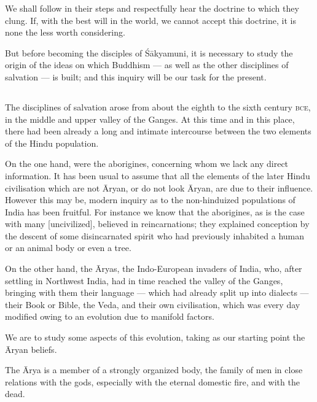 \documentclass[a4paper, 11pt, oneside, english]{article}
\begin{document}
We shall follow in their steps and respectfully hear the doctrine to which they clung. If, with the best will in the world, we cannot accept this doctrine, it is none the less worth considering.

But before becoming the disciples of Śākyamuni, it is necessary to study the origin of the ideas on which Buddhism --- as well as the other disciplines of salvation --- is built; and this inquiry will be our task for the present.

\subsection{}
\paragraph{}
The disciplines of salvation arose from about the eighth to the sixth century \textsc{bce}, in the middle and upper valley of the Ganges. At this time and in this place, there had been already a long and intimate intercourse between the two elements of the Hindu population.

On the one hand, were the aborigines, concerning whom we lack any direct information. It has been usual to assume that all the elements of the later Hindu civilisation which are not Āryan, or do not look Āryan, are due to their influence. However this may be, modern inquiry as to the non-hinduized populations of India has been fruitful. For instance we know that the aborigines, as is the case with many [uncivilized], believed in reincarnations; they explained conception by the descent of some disincarnated spirit who had previously inhabited a human or an animal body or even a tree.

On the other hand, the Āryas, the Indo-European invaders of India, who, after settling in Northwest India, had in time reached the valley of the Ganges, bringing with them their language --- which had already split up into dialects --- their Book or Bible, the Veda, and their own civilisation, which was every day modified owing to an evolution due to manifold factors.

We are to study some aspects of this evolution, taking as our starting point the Āryan beliefs.

The Ārya is a member of a strongly organized body, the family of men in close relations with the gods, especially with the eternal domestic fire, and with the dead.
\end{document}
